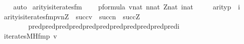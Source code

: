 \begin{isabellebody}
\ \ \ \ \isamarkupfalse%
\ auto\isanewline
{}\isamarkupfalse%
%
\endisatagproof
{\isafoldproof}%
%
\isadelimproof
\isanewline
%
\endisadelimproof
\isanewline
{}\isamarkupfalse%
\ arity{\isacharunderscore}{\kern0pt}is{\isacharunderscore}{\kern0pt}iterates{\isacharunderscore}{\kern0pt}fm\ {\isacharcolon}{\kern0pt}\isanewline
\ \ \ {\isachardoublequoteopen}p{\isasymin}formula{\isachardoublequoteclose}\ {\isachardoublequoteopen}v{\isasymin}nat{\isachardoublequoteclose}\ {\isachardoublequoteopen}n{\isasymin}nat{\isachardoublequoteclose}\ {\isachardoublequoteopen}Z{\isasymin}nat{\isachardoublequoteclose}\ {\isachardoublequoteopen}i{\isasymin}nat{\isachardoublequoteclose}\ \isanewline
\ \ \ \ {\isachardoublequoteopen}arity{\isacharparenleft}{\kern0pt}p{\isacharparenright}{\kern0pt}\ {\isacharequal}{\kern0pt}\ i{\isachardoublequoteclose}\isanewline
\ \ \ {\isachardoublequoteopen}arity{\isacharparenleft}{\kern0pt}is{\isacharunderscore}{\kern0pt}iterates{\isacharunderscore}{\kern0pt}fm{\isacharparenleft}{\kern0pt}p{\isacharcomma}{\kern0pt}v{\isacharcomma}{\kern0pt}n{\isacharcomma}{\kern0pt}Z{\isacharparenright}{\kern0pt}{\isacharparenright}{\kern0pt}\ {\isacharequal}{\kern0pt}\ succ{\isacharparenleft}{\kern0pt}v{\isacharparenright}{\kern0pt}\ {\isasymunion}\ succ{\isacharparenleft}{\kern0pt}n{\isacharparenright}{\kern0pt}\ {\isasymunion}\ succ{\isacharparenleft}{\kern0pt}Z{\isacharparenright}{\kern0pt}\ {\isasymunion}\ \isanewline
\ \ \ \ \ \ \ \ \ \ pred{\isacharparenleft}{\kern0pt}pred{\isacharparenleft}{\kern0pt}pred{\isacharparenleft}{\kern0pt}pred{\isacharparenleft}{\kern0pt}pred{\isacharparenleft}{\kern0pt}pred{\isacharparenleft}{\kern0pt}pred{\isacharparenleft}{\kern0pt}pred{\isacharparenleft}{\kern0pt}pred{\isacharparenleft}{\kern0pt}pred{\isacharparenleft}{\kern0pt}pred{\isacharparenleft}{\kern0pt}i{\isacharparenright}{\kern0pt}{\isacharparenright}{\kern0pt}{\isacharparenright}{\kern0pt}{\isacharparenright}{\kern0pt}{\isacharparenright}{\kern0pt}{\isacharparenright}{\kern0pt}{\isacharparenright}{\kern0pt}{\isacharparenright}{\kern0pt}{\isacharparenright}{\kern0pt}{\isacharparenright}{\kern0pt}{\isacharparenright}{\kern0pt}{\isachardoublequoteclose}\isanewline
%
\isadelimproof
%
\endisadelimproof
%
\isatagproof
{}\isamarkupfalse%
\ {\isacharminus}{\kern0pt}\isanewline
\ \ \isamarkupfalse%
\ {\isacharquery}{\kern0pt}{\isasymphi}\ {\isacharequal}{\kern0pt}\ {\isachardoublequoteopen}iterates{\isacharunderscore}{\kern0pt}MH{\isacharunderscore}{\kern0pt}fm{\isacharparenleft}{\kern0pt}p{\isacharcomma}{\kern0pt}\ {}{\isacharhash}{\kern0pt}{\isacharplus}{\kern0pt}v{\isacharcomma}{\kern0pt}\ {}{\isacharcomma}{\kern0pt}\ {}{\isacharcomma}{\kern0pt}\ {}{\isacharparenright}{\kern0pt}{\isachardoublequoteclose}\isanewline

\end{isabellebody}

